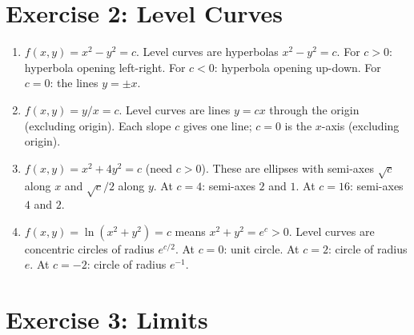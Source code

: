 \documentclass[12pt,a4paper]{article}
\begin{document}
\section*{Exercise 2: Level Curves}

\begin{enumerate}[leftmargin=*, label=(\alph*)]

\item $f(x,y)=x^2-y^2=c$. Level curves are hyperbolas $x^2-y^2=c$.
For $c>0$: hyperbola opening left-right. For $c<0$: hyperbola opening up-down. For $c=0$: the lines $y=\pm x$.

\item $f(x,y)=y/x=c$. Level curves are lines $y=cx$ through the origin (excluding origin). Each slope $c$ gives one line; $c=0$ is the $x$-axis (excluding origin).

\item $f(x,y)=x^2+4y^2=c$ (need $c>0$). These are ellipses with semi-axes $\sqrt{c}$ along $x$ and $\sqrt{c}/2$ along $y$. At $c=4$: semi-axes $2$ and $1$. At $c=16$: semi-axes $4$ and $2$.

\item $f(x,y)=\ln(x^2+y^2)=c$ means $x^2+y^2=e^c>0$. Level curves are concentric circles of radius $e^{c/2}$. At $c=0$: unit circle. At $c=2$: circle of radius $e$. At $c=-2$: circle of radius $e^{-1}$.

\end{enumerate}

\section*{Exercise 3: Limits}
\end{document}
